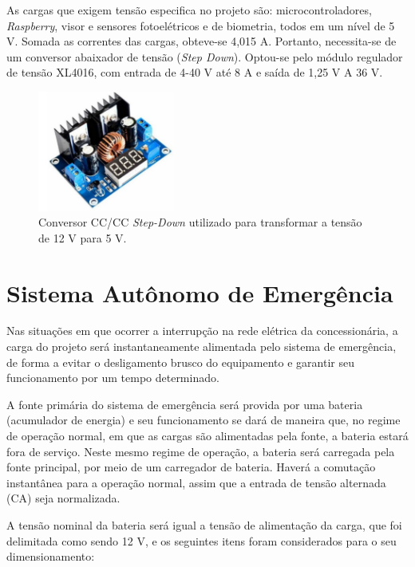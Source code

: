 As cargas que exigem tensão especifica no projeto são: microcontroladores, \emph{Raspberry}, visor e sensores fotoelétricos e de biometria, todos em um nível de 5 V. Somada as correntes das cargas, obteve-se 4,015 A. Portanto, necessita-se de um conversor abaixador de tensão (\textit{Step Down}). Optou-se pelo módulo regulador de tensão XL4016, com entrada de 4-40 V até 8 A e saída de 1,25 V A 36 V. 

\begin{figure}[H]
\centering
    \includegraphics[width=0.4\textwidth]{figuras/energia/fotos_componentes/barramento_5V.png}
    \caption{Conversor CC/CC \textit{Step-Down} utilizado para transformar a tensão de 12 V para 5 V.}
\end{figure}

\section{Sistema Autônomo de Emergência}

Nas situações em que ocorrer a interrupção na rede elétrica da concessionária, a carga do projeto será instantaneamente alimentada pelo sistema de emergência, de forma a evitar o desligamento brusco do equipamento e garantir seu funcionamento por um tempo determinado. 

A fonte primária do sistema de emergência será provida por uma bateria (acumulador de energia) e seu funcionamento se dará de maneira que, no regime de operação normal, em que as cargas são alimentadas pela fonte, a bateria estará fora de serviço. Neste mesmo regime de operação, a bateria será carregada pela fonte principal, por meio de um carregador de bateria. Haverá a comutação instantânea para a operação normal, assim que a entrada de tensão alternada (CA) seja normalizada.

A tensão nominal da bateria será igual a tensão de alimentação da carga, que foi delimitada como sendo 12 V, e os seguintes itens foram considerados para o seu dimensionamento:

